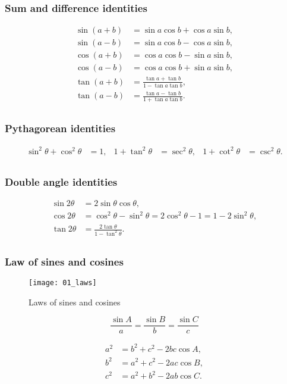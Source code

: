 \subsubsection{Sum and difference identities}

\[\begin{matrix}
{\sin(a + b)} & {= \sin a\cos b + \cos a\sin b,} \\
{\sin(a - b)} & {= \sin a\cos b - \cos a\sin b,} \\
{\cos(a + b)} & {= \cos a\cos b - \sin a\sin b,} \\
{\cos(a - b)} & {= \cos a\cos b + \sin a\sin b,} \\
{\tan(a + b)} & {= \frac{\tan a + \tan b}{1 - \tan a\tan b},} \\
{\tan(a - b)} & {= \frac{\tan a - \tan b}{1 + \tan a\tan b}.} \\
\end{matrix}\]

\subsubsection{Pythagorean identities}

\[\begin{matrix}
{\sin^{2}\theta + \cos^{2}\theta} & {= 1,} & {1 + \tan^{2}\theta} & {= \sec^{2}\theta,} & {1 + \cot^{2}\theta} & {= \csc^{2}\theta.} \\
\end{matrix}\]

\subsubsection{Double angle identities}

\[\begin{matrix}
{\sin 2\theta} & {= 2\sin\theta\cos\theta,} \\
{\cos 2\theta} & {= \cos^{2}\theta - \sin^{2}\theta = 2\cos^{2}\theta - 1 = 1 - 2\sin^{2}\theta,} \\
{\tan 2\theta} & {= \frac{2\tan\theta}{1 - \tan^{2}\theta}.} \\
\end{matrix}\]

\subsubsection{Law of sines and cosines}\label{sin_cos_laws}

\begin{figure}[H]
\centering
    \texttt{[image: 01\_laws]}
\caption{Laws of sines and cosines}
\label{fig:laws-of-sines-and-cosines}
\end{figure}

$$\frac{\sin A}{a}=\frac{\sin B}{b}=\frac{\sin C}{c}$$

\begin{align*}
a^2 &= b^2 + c^2 - 2bc\cos A, \\
b^2 &= a^2 + c^2 - 2ac\cos B, \\
c^2 &= a^2 + b^2 - 2ab\cos C.
\end{align*}
